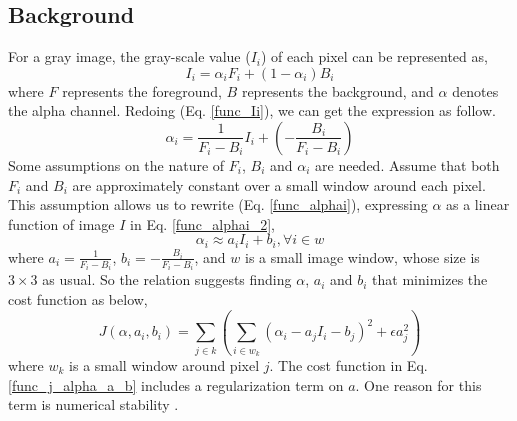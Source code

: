 \documentclass[journal]{IEEEtran}
\begin{document}
\subsection{Background}
\label{subsec:background}
For a gray image, the gray-scale value ($I_i$) of each pixel can be represented as,
\begin{equation}
    I_i = \alpha_{i} F_{i} + (1 - \alpha_{i})B_{i}
    \label{func_Ii}
\end{equation}
where $F$ represents the foreground, $B$ represents the background, and $\alpha$ denotes the alpha channel. Redoing (Eq. \ref{func_Ii}), we can get the expression as follow.
\begin{equation}
    \alpha_{i} = \frac{1}{F_{i} - B_{i}}I_{i} + (-\frac{B_{i}}{F_{i} - B_{i}}) 
    \label{func_alphai}
\end{equation}
Some assumptions on the nature of $F_i$, $B_i$ and $\alpha_i$ are needed. Assume that both $F_i$ and $B_i$ are approximately constant over a small window around  each pixel. This assumption allows us to rewrite (Eq. \ref{func_alphai}), expressing $\alpha$ as a linear function of image $I$ in Eq. \ref{func_alphai_2},
\begin{equation}
    \alpha_{i} \approx a_{i} I_{i} + b_{i}, \forall i\in w
    \label{func_alphai_2}
\end{equation}
where $a_i = \frac{1}{F_{i}-B_{i}}$, $b_i = -\frac{B_{i}}{F_{i}-B_{i}}$, and $w$ is a small image window, whose size is $3\times 3$ as usual. So the relation suggests finding $\alpha$, $a_i$ and $b_i$ that minimizes the cost function as below,
\begin{equation}
    J(\alpha, a_i, b_i) = \sum\limits_{j\in k}\left(\sum\limits_{i\in w_{k}}(\alpha_{i} - a_{j}I_{i} - b_{j})^{2} + \epsilon a_{j}^{2}\right)
    \label{func_j_alpha_a_b}
\end{equation}
where $w_k$ is a small window around pixel $j$. The cost function in Eq. \ref{func_j_alpha_a_b} includes a regularization term on $a$. One reason for this term is numerical stability \cite{levin2007closed}.
\end{document}
